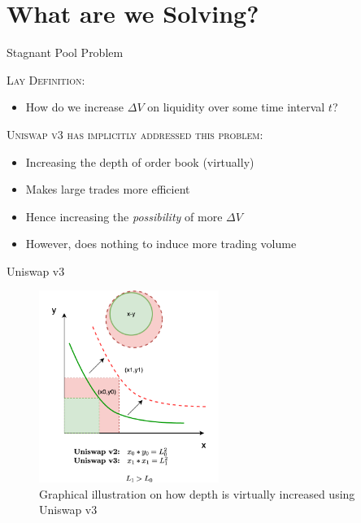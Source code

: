 \documentclass[10pt,xcolor=svgnames]{beamer} %
\begin{document}
\section{What are we Solving?}

\begin{frame}{Stagnant Pool Problem} 

\begin{exampleblock}{\textsc{Lay Definition:}}
\begin{itemize}
  \item How do we increase $\Delta V$ on liquidity over some time interval $t$?
\end{itemize}
\end{exampleblock}

\begin{exampleblock}{\textsc{Uniswap v3 has implicitly addressed this problem:}}
\begin{itemize}
  \item Increasing the depth of order book (virtually)
  \item Makes large trades more efficient
  \item Hence increasing the \textit{possibility} of more $\Delta V$
  \item However, does nothing to induce more trading volume
\end{itemize}
\end{exampleblock}


\end{frame}


\begin{frame}{Uniswap v3} 

\begin{figure}[h!]
\includegraphics[width=2.3in]{img/uniswap_v3.png}
\caption{Graphical illustration on how depth is virtually increased using Uniswap v3} 
\label{fig:uniswap_v3}
\end{figure}

\end{frame}
\end{document}
